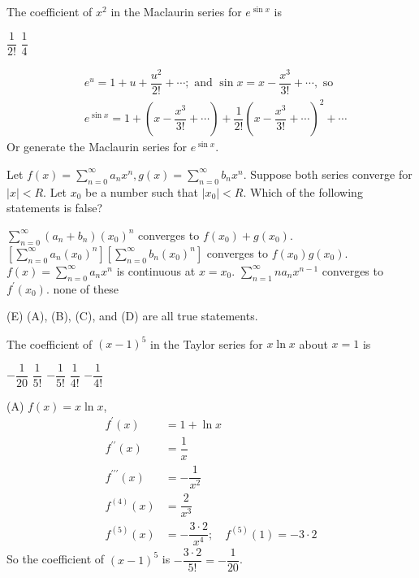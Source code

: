 \question
The coefficient of $x^{2}$ in the Maclaurin series for $e^{\sin x}$ is
\begin{choices}
  \CorrectChoice $\dfrac{1}{2!}$
  \choice $\dfrac{1}{4}$
\end{choices}
\begin{solution}
\[
\begin{aligned}
& e^{u}=1+u+\dfrac{u^{2}}{2!}+\cdots ; \text { and } \sin x=x-\dfrac{x^{3}}{3!}+\cdots, \text { so } \\
& e^{\sin x}=1+\left(x-\dfrac{x^{3}}{3!}+\cdots\right)+\dfrac{1}{2!}\left(x-\dfrac{x^{3}}{3!}+\cdots\right)^{2}+\cdots
\end{aligned}
\]
Or generate the Maclaurin series for $e^{\sin x}$.
\end{solution}



\newpage




\question
Let $f(x)=\sum\limits_{n=0}^{\infty} a_{n} x^{n}, g(x)=\sum\limits_{n=0}^{\infty} b_{n} x^{n}$. Suppose both series converge for $|x|<R$. Let $x_{0}$ be a number such that $\left|x_{0}\right|<R$. Which of the following statements is false?
\begin{choices}
  \choice $\sum\limits_{n=0}^{\infty}\left(a_{n}+b_{n}\right)\left(x_{0}\right)^{n}$ converges to $f\left(x_{0}\right)+g\left(x_{0}\right)$.
  \choice $\left[\sum\limits_{n=0}^{\infty} a_{n}\left(x_{0}\right)^{n}\right]\left[\sum\limits_{n=0}^{\infty} b_{n}\left(x_{0}\right)^{n}\right]$ converges to $f\left(x_{0}\right) g\left(x_{0}\right)$.
  \choice $f(x)=\sum\limits_{n=0}^{\infty} a_{n} x^{n}$ is continuous at $x=x_{0}$.
  \choice $\sum\limits_{n=1}^{\infty} n a_{n} x^{n-1}$ converges to $f^{\prime}\left(x_{0}\right)$.
  \CorrectChoice none of these
\end{choices}
\begin{solution}
(E) (A), (B), (C), and (D) are all true statements.
\end{solution}

\question
The coefficient of $(x-1)^{5}$ in the Taylor series for $x \ln x$ about $x=1$ is
\begin{choices}
  \CorrectChoice $-\dfrac{1}{20}$
  \choice $\dfrac{1}{5!}$
  \choice $-\dfrac{1}{5!}$
  \choice $\dfrac{1}{4!}$
  \choice $-\dfrac{1}{4!}$
\end{choices}
\begin{solution}
(A) $f(x)=x \ln x$,
\[
\begin{aligned}
f^{\prime}(x) & =1+\ln x \\
f^{\prime \prime}(x) & =\dfrac{1}{x} \\
f^{\prime \prime \prime}(x) & =-\dfrac{1}{x^{2}} \\
f^{(4)}(x) & =\dfrac{2}{x^{3}} \\
f^{(5)}(x) & =-\dfrac{3 \cdot 2}{x^{4}} ; \quad f^{(5)}(1)=-3 \cdot 2
\end{aligned}
\]
So the coefficient of $(x-1)^{5}$ is $-\dfrac{3 \cdot 2}{5!}=-\dfrac{1}{20}$.
\end{solution}



